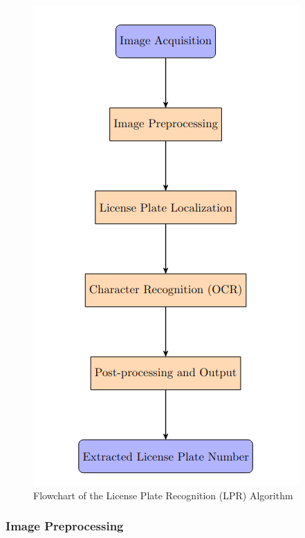 \begin{figure}[htbp]
    \centering
    \includegraphics[width=0.95 \textwidth]{figures/LPR.png}
    \caption{ Flowchart of the License Plate Recognition (LPR) Algorithm}
    \label{fig:lpr-flow-chart}
\end{figure}


\subsubsection{Image Preprocessing}
\label{subsubsec:preprocessing}

